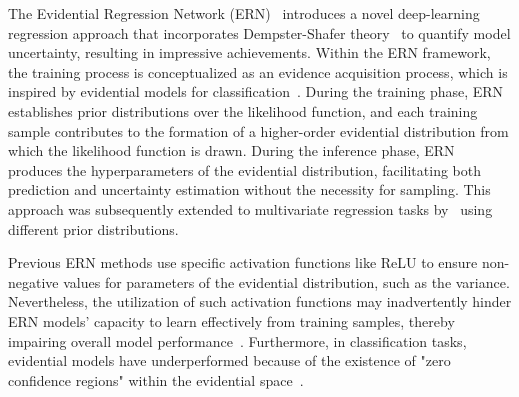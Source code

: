 The Evidential Regression Network (ERN)~\cite{NEURIPS2020_aab08546} introduces a novel deep-learning regression approach that incorporates Dempster-Shafer theory~\cite{shafer1976mathematical} to quantify model uncertainty, resulting in impressive achievements. Within the ERN framework, the training process is conceptualized as an evidence acquisition process, which is inspired by evidential models for classification~\cite{malinin2018predictive,malinin2019reverse,bilovs2019uncertainty,haussmann2019bayesian,malinin2019ensemble}. 
During the training phase, ERN establishes prior distributions over the likelihood function, and each training sample contributes to the formation of a higher-order evidential distribution from which the likelihood function is drawn. 
During the inference phase, ERN produces the hyperparameters of the evidential distribution, facilitating both prediction and uncertainty estimation without the necessity for sampling. 
This approach was subsequently extended to multivariate regression tasks by~\citeauthor{meinert2021multivariate} using different prior distributions. 

Previous ERN methods \cite{NEURIPS2020_aab08546,malinin2020regression,charpentier2021natural,oh2022improving,feng2023deep,mei2023uncertainty} use specific activation functions like ReLU to ensure non-negative values for parameters of the evidential distribution, such as the variance.
Nevertheless, the utilization of such activation functions may inadvertently hinder ERN models' capacity to learn effectively from training samples, thereby impairing overall model performance~\cite{pandey2023learn}. 
Furthermore, in classification tasks, evidential models have underperformed because of the existence of "zero confidence regions" within the evidential space~\cite{pandey2023learn}.


